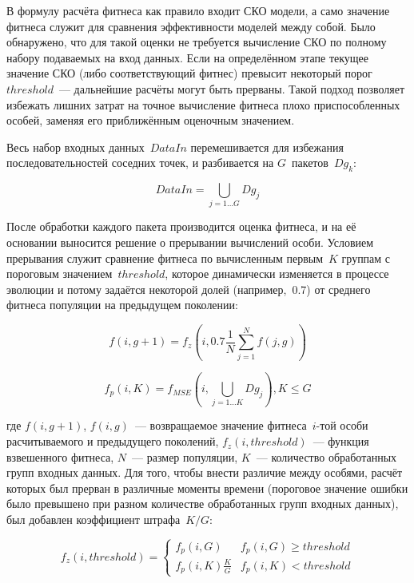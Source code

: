 В формулу расчёта фитнеса как правило входит СКО модели, а само значение фитнеса служит для сравнения эффективности моделей между собой. Было обнаружено, что для такой оценки не требуется вычисление СКО по полному набору подаваемых на вход данных. Если на определённом этапе текущее значение СКО (либо соответствующий фитнес) превысит некоторый порог~$threshold$~--- дальнейшие расчёты могут быть прерваны. Такой подход позволяет избежать лишних затрат на точное вычисление фитнеса плохо приспособленных особей, заменяя его приближённым оценочным значением.

Весь набор входных данных~$DataIn$ перемешивается для избежания последовательностей соседних точек, и разбивается на $G$~пакетов~$Dg_{k}$:

\begin{equation}
\label{eq:zerg_partial_mse_groups}
DataIn=\bigcup_{j=1\ldots G}{Dg_{j}}
\end{equation}

После обработки каждого пакета производится оценка фитнеса, и на её основании выносится решение о прерывании вычислений особи. Условием прерывания служит сравнение фитнеса по вычисленным первым~$K$ группам с пороговым значением~$threshold$, которое динамически изменяется в процессе эволюции и потому задаётся некоторой долей (например,~0.7) от среднего фитнеса популяции на предыдущем поколении:

\begin{equation}
\label{eq:zerg_partial_mse_fit_form}
f(i, g + 1) = f_{z}(i, 0.7 \frac{1}{N}\sum\limits_{j=1}^{N}{f(j,g)})
\end{equation}

\begin{equation}
\label{eq:zerg_partial_mse_fit_form_exp}
f_{p}(i, K) = f_{MSE}(i, \bigcup_{j=1\ldots K}{Dg_{j}}), K \le G
\end{equation}

где $f(i, g + 1)$, $f(i, g)$~--- возвращаемое значение фитнеса~$i$-той особи расчитываемого и предыдущего поколений, $f_{z}(i, threshold)$~--- функция взвешенного фитнеса, $N$~--- размер популяции, $K$~--- количество обработанных групп входных данных. Для того, чтобы внести различие между особями, расчёт которых был прерван в различные моменты времени (пороговое значение ошибки было превышено при разном количестве обработанных групп входных данных), был добавлен коэффициент штрафа~$K/G$:

\begin{equation}
\label{eq:zerg_partial_mse_fitness}
f_{z}(i, threshold) =
	\begin{cases}
		f_{p}(i, G) & f_{p}(i, G) \ge threshold \\
		f_{p}(i, K)\frac{K}{G} & f_{p}(i, K) < threshold
	\end{cases}
\end{equation}


